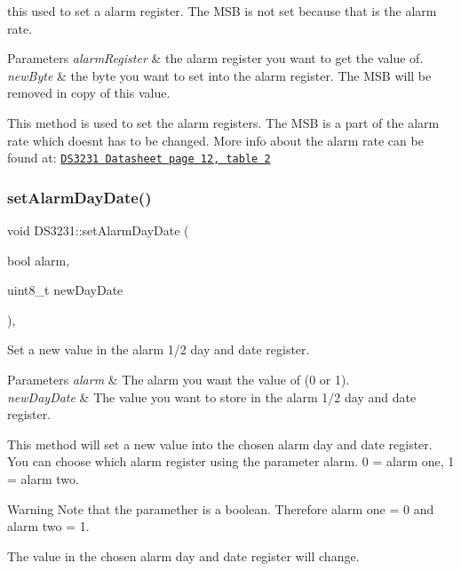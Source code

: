 this used to set a alarm register. The M\+SB is not set because that is the alarm rate. 


\begin{DoxyParams}{Parameters}
{\em alarm\+Register} & the alarm register you want to get the value of. \\
\hline
{\em new\+Byte} & the byte you want to set into the alarm register. The M\+SB will be removed in copy of this value.\\
\hline
\end{DoxyParams}
This method is used to set the alarm registers. The M\+SB is a part of the alarm rate which doesn\textquotesingle{}t has to be changed. More info about the alarm rate can be found at\+: \href{https://datasheets.maximintegrated.com/en/ds/DS3231.pdf}{\tt D\+S3231 Datasheet page 12, table 2} \mbox{\label{class_d_s3231_aa2048cc766ca58f707e84cbc564c1276}} 
\subsubsection{\texorpdfstring{set\+Alarm\+Day\+Date()}{setAlarmDayDate()}}
{\footnotesize\ttfamily void D\+S3231\+::set\+Alarm\+Day\+Date (\begin{DoxyParamCaption}\item[{bool}]{alarm,  }\item[{uint8\+\_\+t}]{new\+Day\+Date }\end{DoxyParamCaption})\hspace{0.3cm}{\ttfamily [override]}, {\ttfamily [virtual]}}



Set a new value in the alarm 1/2 day and date register. 


\begin{DoxyParams}{Parameters}
{\em alarm} & The alarm you want the value of (0 or 1). \\
\hline
{\em new\+Day\+Date} & The value you want to store in the alarm 1/2 day and date register.\\
\hline
\end{DoxyParams}
This method will set a new value into the chosen alarm day and date register. You can choose which alarm register using the parameter alarm. 0 = alarm one, 1 = alarm two. \begin{DoxyWarning}{Warning}
Note that the paramether is a boolean. Therefore alarm one = 0 and alarm two = 1. 

The value in the chosen alarm day and date register will change. 
\end{DoxyWarning}


